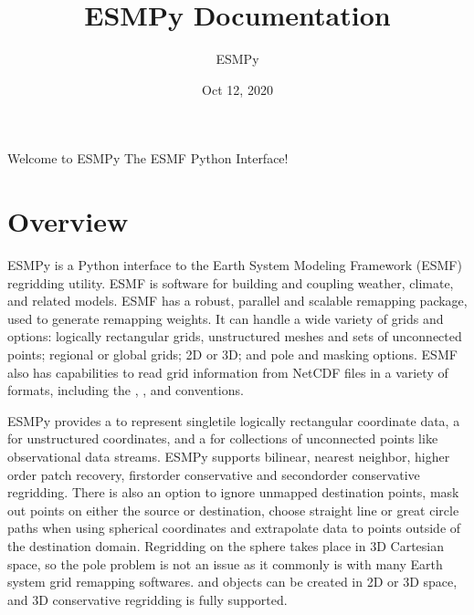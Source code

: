 \documentclass[letterpaper,10pt,english]{sphinxmanual}
\title{ESMPy Documentation}
\date{Oct 12, 2020}
\author{ESMPy}
\begin{document}
\pagestyle{empty}
\sphinxmaketitle
\pagestyle{plain}
\sphinxtableofcontents
\pagestyle{normal}
\label{\detokenize{index::doc}}


Welcome to ESMPy \sphinxhyphen{} The ESMF Python Interface!


\chapter{Overview}
\label{\detokenize{intro:module-ESMF}}\label{\detokenize{intro:overview}}\label{\detokenize{intro::doc}}
ESMPy is a Python interface to the Earth System Modeling Framework (ESMF) 
regridding utility. ESMF is software for
building and coupling weather, climate, and related models. ESMF has a robust,
parallel and scalable remapping package, used to generate remapping weights.
It can handle a wide variety of grids and options: logically rectangular grids,
unstructured meshes and sets of unconnected points; regional or global grids;
2D or 3D; and pole and masking options. ESMF also has capabilities to read grid
information from NetCDF files in a variety of formats, including the
,
,
and
conventions.

ESMPy provides a {\hyperref[\detokenize{grid:ESMF.api.grid.Grid}]{}} to represent single\sphinxhyphen{}tile logically
rectangular coordinate data, a {\hyperref[\detokenize{mesh:ESMF.api.mesh.Mesh}]{}} for unstructured 
coordinates, and a {\hyperref[\detokenize{locstream:ESMF.api.locstream.LocStream}]{}} for collections of
unconnected points like observational data streams.
ESMPy supports bilinear, nearest neighbor, higher order patch recovery, 
first\sphinxhyphen{}order conservative and second\sphinxhyphen{}order conservative regridding. There is 
also an option to ignore unmapped destination points, mask out points on either
the source or destination, choose straight line or great circle paths when using
spherical coordinates and extrapolate data to points outside of the destination
domain. Regridding on the sphere takes place in 3D Cartesian space, so the pole
problem is not an issue as it commonly is with many Earth system grid remapping
softwares. {\hyperref[\detokenize{grid:ESMF.api.grid.Grid}]{}} and {\hyperref[\detokenize{mesh:ESMF.api.mesh.Mesh}]{}} 
objects can be created in 2D or 3D space, and 3D conservative regridding is 
fully supported.
\end{document}
